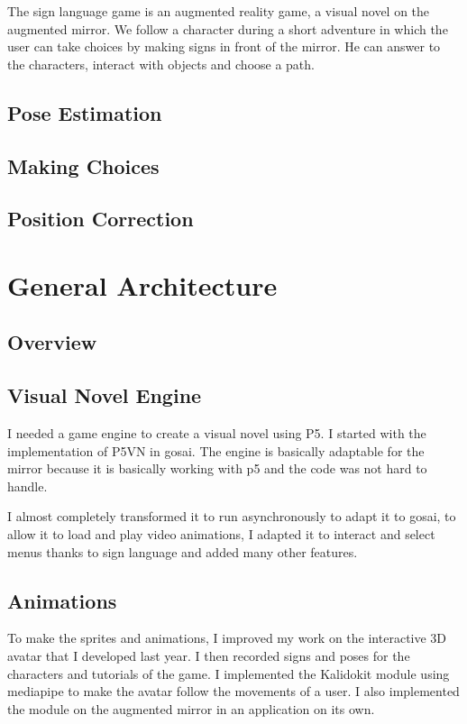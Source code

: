 The sign language game is an augmented reality game, a visual novel on the augmented mirror. We follow a character during a short adventure in which the user can take choices by making signs in front of the mirror. He can answer to the characters, interact with objects and choose a path.

\subsection{Pose Estimation}



\subsection{Making Choices}


\subsection{Position Correction}

\section{General Architecture}

\subsection{Overview}

\subsection{Visual Novel Engine}

I needed a game engine to create a visual novel using P5. I started with the implementation of P5VN in gosai. The engine is basically adaptable for the mirror because it is basically working with p5 and the code was not hard to handle.

I almost completely transformed it to run asynchronously to adapt it to gosai, to allow it to load and play video animations, I adapted it to interact and select menus thanks to sign language and added many other features.


\subsection{Animations}

To make the sprites and animations, I improved my work on the interactive 3D avatar that I developed last year. I then recorded signs and poses for the characters and tutorials of the game. I implemented the Kalidokit module using mediapipe to make the avatar follow the movements of a user. I also implemented the module on the augmented mirror in an application on its own.


